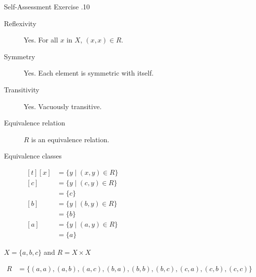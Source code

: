 \documentclass[\main/notes.tex]{subfiles}
\begin{document}
\begin{exercise}{Self-Assessment Exercise \thechapter.10}
\begin{questions}
\begin{questions}
\begin{answer}
\begin{description}
											\item[Reflexivity] Yes. For all $x$ in $X$, $(x, x) \in R$.
											\item[Symmetry] Yes. Each element is symmetric with itself.
											\item[Transitivity] Yes. Vacuously transitive.
											\item[Equivalence relation] $R$ is an equivalence relation.
											\item[Equivalence classes] $
												\begin{aligned}[t]
													[x] &= \{y \mid (x, y) \in R\}\\
													[c] &= \{y \mid (c, y) \in R\}\\
													&= \{c\}\\
													[b] &= \{y \mid (b, y) \in R\}\\
													&= \{b\}\\
													[a] &= \{y \mid (a, y) \in R\}\\
													&= \{a\}
												\end{aligned} $ 
										\end{description}
									\end{answer}
								\pagebreak
								\item $ X = \{a, b, c\}$ and $R = X \times X$
									\begin{answer}
										\begin{align*}
											R &= \bigl\{(a, a), (a, b), (a, c), (b, a), (b, b), (b, c), (c, a), (c, b), (c, c)\bigr\}
										\end{align*}
\end{answer}
\end{questions}
\end{questions}
\end{exercise}
\end{document}
